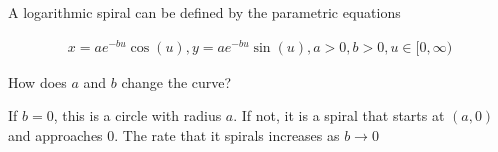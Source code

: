 A logarithmic spiral can be defined by the parametric equations

\begin{align*}
    x = ae^{-bu} \cos{(u)}, y = ae^{-bu} \sin{(u)}, a > 0, b > 0, u \in [0, \infty)
\end{align*}

How does $a$ and $b$ change the curve?

\begin{solution}
    If $b=0$, this is a circle with radius $a$. If not, it is a spiral that starts at $\left(a, 0\right)$ and approaches 0. The rate that it spirals increases as $b \to 0$
\end{solution}